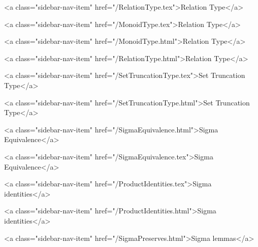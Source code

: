       
    
      
        
          <a class="sidebar-nav-item" href="/RelationType.tex">Relation Type</a>
        
      
    
      
        
          <a class="sidebar-nav-item" href="/MonoidType.tex">Relation Type</a>
        
      
    
      
        
          <a class="sidebar-nav-item" href="/MonoidType.html">Relation Type</a>
        
      
    
      
        
          <a class="sidebar-nav-item" href="/RelationType.html">Relation Type</a>
        
      
    
      
        
          <a class="sidebar-nav-item" href="/SetTruncationType.tex">Set Truncation Type</a>
        
      
    
      
        
          <a class="sidebar-nav-item" href="/SetTruncationType.html">Set Truncation Type</a>
        
      
    
      
        
          <a class="sidebar-nav-item" href="/SigmaEquivalence.html">Sigma Equivalence</a>
        
      
    
      
        
          <a class="sidebar-nav-item" href="/SigmaEquivalence.tex">Sigma Equivalence</a>
        
      
    
      
        
          <a class="sidebar-nav-item" href="/ProductIdentities.tex">Sigma identities</a>
        
      
    
      
        
          <a class="sidebar-nav-item" href="/ProductIdentities.html">Sigma identities</a>
        
      
    
      
        
          <a class="sidebar-nav-item" href="/SigmaPreserves.html">Sigma lemmas</a>
        
